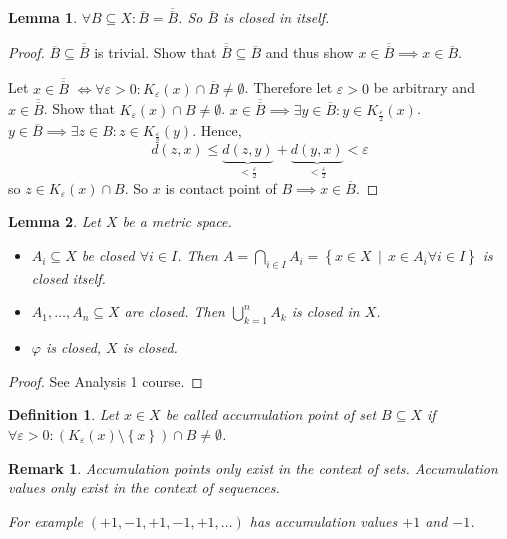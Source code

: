 \documentclass{article}
\newtheorem{definition}{Definition}  \numberwithin{definition}{section}
\newtheorem{lemma}{Lemma}  \numberwithin{lemma}{section}
\newtheorem{remark}{Remark}  \numberwithin{remark}{section}
\newcommand{\set}[1]{\left\{#1\right\}}
\newcommand{\setdef}[2]{\left\{\left.#1\,\middle|\,#2\right.\right\}}
\newcommand\doubleoverline[1]{\overline{\overline{#1}}}
\begin{document}
\begin{lemma}
  $\forall B \subseteq X: \overline{B} = \doubleoverline{B}$.
  So $\overline{B}$ is closed in itself.
\end{lemma}
\begin{proof}
  $\overline B \subseteq \doubleoverline B$ is trivial. Show that $\doubleoverline B \subseteq \overline B$ and thus show $x \in \doubleoverline B \implies x \in \overline{B}$.

  Let $x \in \overline{\overline{B}}$
  $\iff \forall \varepsilon > 0: K_{\varepsilon}(x) \cap \overline{B} \neq \emptyset$.
  Therefore let $\varepsilon > 0$ be arbitrary and $x \in \overline{\overline{B}}$.
  Show that $K_{\varepsilon}(x) \cap B \neq \emptyset$.
  $x \in \overline{\overline{B}} \implies \exists y \in \overline{B}: y \in K_{\frac\varepsilon2}(x)$.
  $y \in \overline{B} \implies \exists z \in B: z \in K_{\frac\varepsilon2}(y)$. Hence,
  \[ d(z,x) \leq \underbrace{d(z,y)}_{<\frac\varepsilon2} + \underbrace{d(y,x)}_{<\frac\varepsilon2} < \varepsilon \]
  so $z \in K_\varepsilon(x) \cap B$. So $x$ is contact point of $B \implies x \in \overline{B}$.
\end{proof}

\begin{lemma}
  \label{lemma4}
  Let $X$ be a metric space.
  \begin{itemize}
    \item
      $A_i \subseteq X$ be closed $\forall i \in I$.
      Then $A = \bigcap_{i \in I} A_i = \setdef{x \in X}{x \in A_i \forall i \in I}$
      is closed itself.
    \item
      $A_1, \dots, A_n \subseteq X$ are closed. Then $\bigcup_{k=1}^n A_k$ is closed in $X$.
    \item
      $\varphi$ is closed, $X$ is closed.
  \end{itemize}
\end{lemma}

\begin{proof}
  See Analysis 1 course.
\end{proof}

\begin{definition} %
  Let $x \in X$ be called accumulation point of set $B \subseteq X$ if $\forall \varepsilon > 0: (K_{\varepsilon}(x) \setminus \set{x}) \cap B \neq \emptyset$.
\end{definition}

\begin{remark}
  Accumulation \emph{points} only exist in the context of \emph{sets}.
  Accumulation \emph{values} only exist in the context of \emph{sequences}.

  For example $(+1, -1, +1, -1, +1, \dots)$ has accumulation \emph{values} $+1$ and $-1$.
\end{remark}
\end{document}
